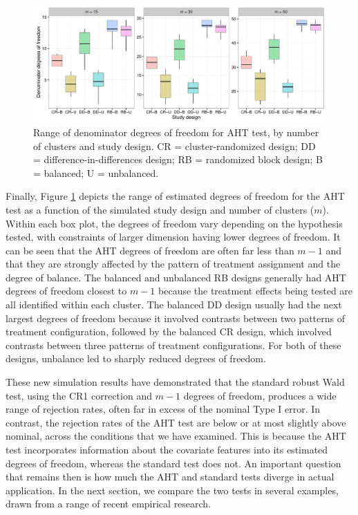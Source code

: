 \documentclass[12pt]{article}\usepackage[]{graphicx}\usepackage[]{color}
\newenvironment{knitrout}{}{} %
\begin{document}
\begin{knitrout}
\color{fgcolor}\begin{figure}

{\centering \includegraphics[width=\linewidth]{CR_fig/df-1} 

}

\caption[Range of denominator degrees of freedom for AHT test, by number of clusters and study design]{Range of denominator degrees of freedom for AHT test, by number of clusters and study design. CR = cluster-randomized design; DD = difference-in-differences design; RB = randomized block design; B = balanced; U = unbalanced.}\label{fig:df}
\end{figure}


\end{knitrout}

Finally, Figure \ref{fig:df} depicts the range of estimated degrees of freedom for the AHT test as a function of the simulated study design and number of clusters ($m$). 
Within each box plot, the degrees of freedom vary depending on the hypothesis tested, with constraints of larger dimension having lower degrees of freedom. 
It can be seen that the AHT degrees of freedom are often far less than $m - 1$ and that they are strongly affected by the pattern of treatment assignment and the degree of balance. The balanced and unbalanced RB designs generally had AHT degrees of freedom closest to $m - 1$ because the treatment effects being tested are all identified within each cluster. 
The balanced DD design usually had the next largest degrees of freedom because it involved contrasts between two patterns of treatment configuration, followed by the balanced CR design, which involved contrasts between three patterns of treatment configurations. 
For both of these designs, unbalance led to sharply reduced degrees of freedom.

These new simulation results have demonstrated that the standard robust Wald test, using the CR1 correction and $m - 1$ degrees of freedom, produces a wide range of rejection rates, often far in excess of the nominal Type I error. 
In contrast, the rejection rates of the AHT test are below or at most slightly above nominal, across the conditions that we have examined.
This is because the AHT test incorporates information about the covariate features into its estimated degrees of freedom, whereas the standard test does not.
An important question that remains then is how much the AHT and standard tests diverge in actual application.
In the next section, we compare the two tests in several examples, drawn from a range of recent empirical research.
\end{document}
